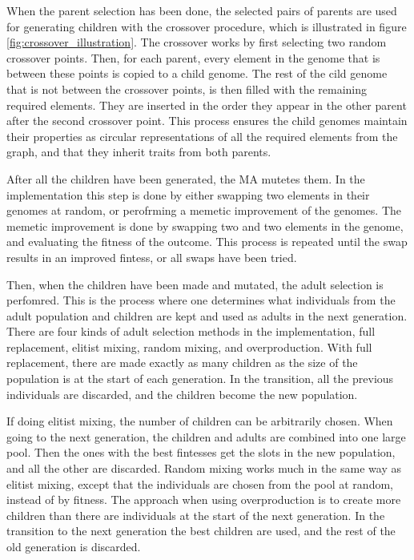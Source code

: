 When the parent selection has been done, the selected pairs of parents are used for generating children with the crossover procedure, which is illustrated in figure \ref{fig:crossover_illustration}. The crossover works by first selecting two random crossover points. Then, for each parent, every element in the genome that is between these points is copied to a child genome. The rest of the cild genome that is not between the crossover points, is then filled with the remaining required elements. They are inserted in the order they appear in the other parent after the second crossover point. This process ensures the child genomes maintain their properties as circular representations of all the required elements from the graph, and that they inherit traits from both parents.

After all the children have been generated, the MA mutetes them. In the implementation this step is done by either swapping two elements in their genomes at random, or perofrming a memetic improvement of the genomes. The memetic improvement is done by swapping two and two elements in the genome, and evaluating the fitness of the outcome. This process is repeated until the swap results in an improved fintess, or all swaps have been tried.

Then, when the children have been made and mutated, the adult selection is perfomred. This is the process where one determines what individuals from the adult population and children are kept and used as adults in the next generation. There are four kinds of adult selection methods in the implementation, full replacement, elitist mixing, random mixing, and overproduction. With full replacement, there are made exactly as many children as the size of the population is at the start of each generation. In the transition, all the previous individuals are discarded, and the children become the new population.

If doing elitist mixing, the number of children can be arbitrarily chosen. When going to the next generation, the children and adults are combined into one large pool. Then the ones with the best fintesses get the slots in the new population, and all the other are discarded. Random mixing works much in the same way as elitist mixing, except that the individuals are chosen from the pool at random, instead of by fitness. The approach when using overproduction is to create more children than there are individuals at the start of the next generation. In the transition to the next generation the best children are used, and the rest of the old generation is discarded.

